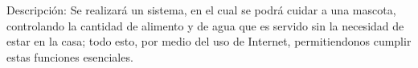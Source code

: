 Descripción:
Se realizará un sistema, en el cual se podrá cuidar a una mascota, controlando la cantidad de alimento y de agua que es servido sin la necesidad de estar en la casa; todo esto, por medio del uso de Internet, permitiendonos cumplir estas funciones esenciales.
